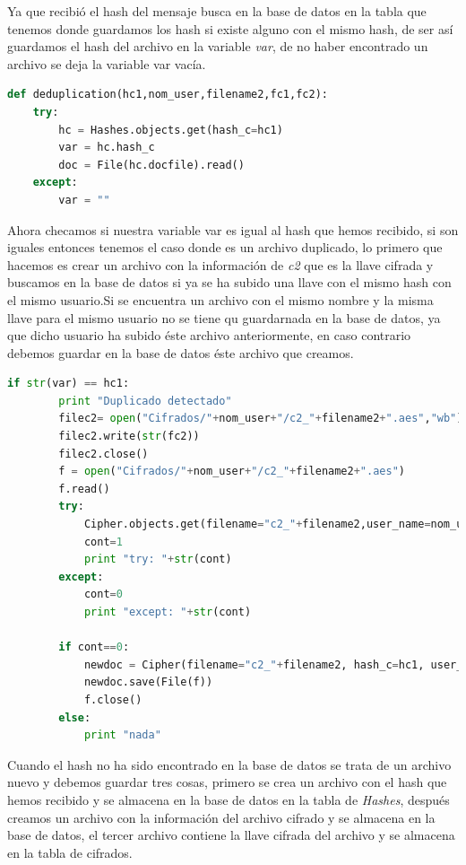 Ya que recibió el hash del mensaje busca en la base de datos en la tabla que tenemos donde guardamos los hash si existe alguno con el mismo hash, de ser así guardamos el hash del archivo en la variable \textit{var}, de no haber encontrado un archivo se deja la variable var vacía.

\begin{lstlisting}[language=Python,frame=single, keywordstyle=\color{blue},breaklines=true, showstringspaces=false]
    def deduplication(hc1,nom_user,filename2,fc1,fc2):
    try:
        hc = Hashes.objects.get(hash_c=hc1)
        var = hc.hash_c
        doc = File(hc.docfile).read()
    except:
        var = ""
\end{lstlisting}

Ahora checamos si nuestra variable var es igual al hash que hemos recibido, si son iguales entonces tenemos el caso donde es un archivo duplicado, lo primero que hacemos es crear un archivo con la información de \textit{c2} que es la llave cifrada y buscamos en la base de datos si ya se ha subido una llave con el mismo hash con el mismo usuario.Si se encuentra un archivo con el mismo nombre y la misma llave para el mismo usuario no se tiene qu guardarnada en la base de datos, ya que dicho usuario ha subido éste archivo anteriormente, en caso contrario debemos guardar en la base de datos éste archivo que creamos.

\begin{lstlisting}[language=Python,frame=single, keywordstyle=\color{blue},breaklines=true, showstringspaces=false]
 if str(var) == hc1:
        print "Duplicado detectado"
        filec2= open("Cifrados/"+nom_user+"/c2_"+filename2+".aes","wb")
        filec2.write(str(fc2))
        filec2.close()
        f = open("Cifrados/"+nom_user+"/c2_"+filename2+".aes")
        f.read()
        try:
            Cipher.objects.get(filename="c2_"+filename2,user_name=nom_user)
            cont=1
            print "try: "+str(cont)
        except:
            cont=0
            print "except: "+str(cont)

        if cont==0:
            newdoc = Cipher(filename="c2_"+filename2, hash_c=hc1, user_name=nom_user, docfile=File(f))
            newdoc.save(File(f))
            f.close()
        else:
            print "nada"
\end{lstlisting}

Cuando el hash no ha sido encontrado en la base de datos se trata de un archivo nuevo y debemos guardar tres cosas, primero se crea un archivo con el hash que hemos recibido y se almacena en la base de datos en la tabla de \textit{Hashes}, después creamos un archivo con la información del archivo cifrado y se almacena en la base de datos, el tercer archivo contiene la llave cifrada del archivo y se almacena en la tabla de cifrados.

